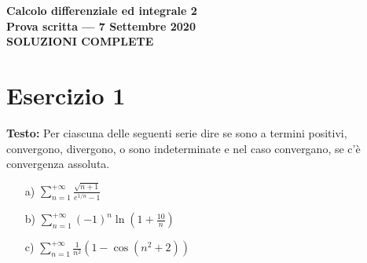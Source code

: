 \documentclass[12pt, a4paper]{article}
\begin{document}
\begin{center}
\Large\textbf{Calcolo differenziale ed integrale 2}\\
\large\textbf{Prova scritta --- 7 Settembre 2020}\\
\large\textbf{SOLUZIONI COMPLETE}
\end{center}

\vspace{1cm}

\section*{Esercizio 1}

\textbf{Testo:} Per ciascuna delle seguenti serie dire se sono a termini positivi, convergono, divergono, o sono indeterminate e nel caso convergano, se c'è convergenza assoluta.
\begin{enumerate}
    \item[a)] $\displaystyle\sum_{n=1}^{+\infty} \frac{\sqrt{n+1}}{e^{1/n}-1}$
    \item[b)] $\displaystyle\sum_{n=1}^{+\infty} (-1)^{n} \ln\left(1+\frac{10}{n}\right)$
    \item[c)] $\displaystyle\sum_{n=1}^{+\infty} \frac{1}{n^{2}}(1-\cos(n^{2}+2))$
\end{enumerate}
\end{document}
